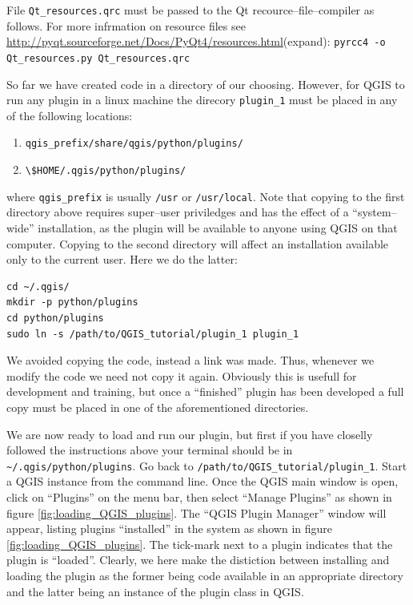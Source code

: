 
File \lstinline{Qt_resources.qrc} must be passed to the Qt recource--file--compiler as follows. For more infrmation on resource files see \url{http://pyqt.sourceforge.net/Docs/PyQt4/resources.html}(expand):
\lstinline{pyrcc4 -o Qt_resources.py Qt_resources.qrc}
\par%
So far we have created code in a directory of our choosing. However, for QGIS to run any plugin in a linux machine the direcory \lstinline{plugin_1} must be placed in any of the following locations:
\begin{enumerate}
  \item \lstinline{qgis_prefix/share/qgis/python/plugins/}
  \item \lstinline{\$HOME/.qgis/python/plugins/}
\end{enumerate}
where  \lstinline{qgis_prefix} is usually \lstinline{/usr} or \lstinline{/usr/local}. Note that copying to the first directory above requires super--user priviledges and has the effect of a ``system--wide'' installation, as the plugin will be available to anyone using QGIS on that computer. Copying to the second directory will affect an installation available only to the current user. Here we do the latter:
\begin{lstlisting}
cd ~/.qgis/
mkdir -p python/plugins
cd python/plugins
sudo ln -s /path/to/QGIS_tutorial/plugin_1 plugin_1
\end{lstlisting}
We avoided copying the code, instead a link was made. Thus, whenever we modify the code we need not copy it again. Obviously this is usefull for development and training, but once a ``finished'' plugin has been developed a full copy must be placed in one of the aforementioned directories.
\par%
We are now ready to load and run our plugin, but first if you have closelly followed the instructions above your terminal should be in \lstinline{~/.qgis/python/plugins}. Go back to \lstinline{/path/to/QGIS_tutorial/plugin_1}. Start a QGIS instance from the command line. Once the QGIS main window is open, click on ``Plugins'' on the menu bar, then select ``Manage Plugins'' as shown in figure \ref{fig:loading_QGIS_plugins}. The ``QGIS Plugin Manager'' window will appear, listing plugins ``installed'' in the system as shown in figure \ref{fig:loading_QGIS_plugins}. The tick-mark next to a plugin indicates that the plugin is ``loaded''. Clearly, we here make the distiction between installing and loading the plugin as the former being code available in an appropriate directory and the latter being an instance of the plugin class in QGIS.
